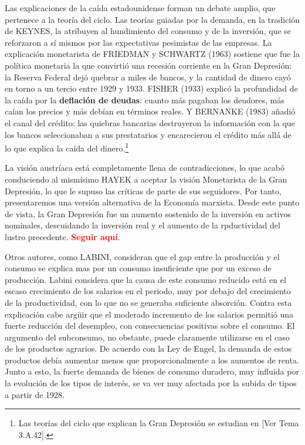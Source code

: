 \documentclass[10pt,a4paper]{article}
\newcommand{\authorfont}[1]{{\fontfamily{EBGaramond-TLF}\selectfont #1}}
\begin{document}
Las explicaciones de la caída estadounidense forman un debate amplio, que pertenece a la teoría del ciclo. Las teorías guiadas por la demanda, en la tradición de KEYNES, la atribuyen al hundimiento del consumo y de la inversión, que se reforzaron a sí mismos por las expectativas pesimistas de las empresas. La explicación monetarista de FRIEDMAN y SCHWARTZ (1963) sostiene que fue la política monetaria la que convirtió una recesión corriente en la Gran Depresión: la Reserva Federal dejó quebrar a miles de bancos, y la cantidad de dinero cayó en torno a un tercio entre 1929 y 1933. FISHER (1933) explicó la profundidad de la caída por la \textbf{deflación de deudas}: cuanto más pagaban los deudores, más caían los precios y más debían en términos reales. Y BERNANKE (1983) añadió el canal del crédito: las quiebras bancarias destruyeron la información con la que los bancos seleccionaban a sus prestatarios y encarecieron el crédito más allá de lo que explica la caída del dinero.\footnote{%
    Las teorías del ciclo que explican la Gran Depresión se estudian en [\authorfont{Ver Tema 3.A.42}].
}

La visión austríaca está completamente llena de contradicciones, lo que acabó conduciendo al mismísimo HAYEK a aceptar la visión Monetarista de la Gran Depresión, lo que le supuso las críticas de parte de sus seguidores. Por tanto, presentaremos una versión alternativa de la Economía marxista. Desde este punto de vista, la Gran Depresión fue un aumento sostenido de la inversión en activos nominales, descuidando la inversión real y el aumento de la rpductividad del lustro precedente. \textcolor{red}{\textbf{Seguir aquí}}.

Otros autores, como LABINI, consideran que el gap entre la producción y el consumo se explica mas por un consumo insuficiente que por un exceso de producción. Labini considera que la causa de este consumo reducido está en el escaso crecimiento de los salarios en el periodo, muy por debajo del crecimiento de la productividad, con lo que no se generaba suficiente absorción. Contra esta explicación cabe argüir que el moderado incremento de los salarios permitió una fuerte reducción del desempleo, con consecuencias positivas sobre el consumo. El argumento del subconsumo, no obstante, puede claramente utilizarse en el caso de los productos agrarios. De acuerdo con la Ley de Engel, la demanda de estos productos debía aumentar menos que proporcionalmente a los aumentos de renta. Junto a esto, la fuerte demanda de bienes de consumo duradero, muy influida por la evolución de los tipos de interés, se va ver muy afectada por la subida de tipos a partir de 1928.
\end{document}
